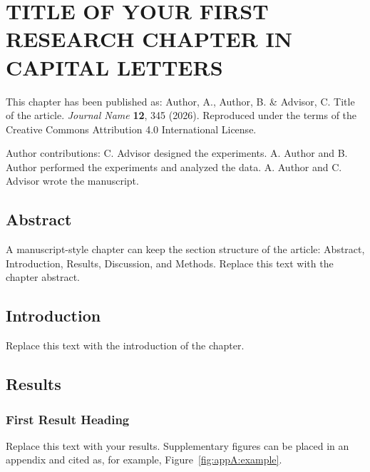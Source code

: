 \chapter{TITLE OF YOUR FIRST RESEARCH CHAPTER IN CAPITAL LETTERS}
\label{ch:manuscript}

\begin{chapternote}
This chapter has been published as: Author, A., Author, B. \& Advisor, C. Title of the article. \textit{Journal Name} \textbf{12}, 345 (2026). Reproduced under the terms of the Creative Commons Attribution 4.0 International License.

Author contributions: C. Advisor designed the experiments. A. Author and B. Author performed the experiments and analyzed the data. A. Author and C. Advisor wrote the manuscript.
\end{chapternote}

\section{Abstract}

A manuscript-style chapter can keep the section structure of the article: Abstract, Introduction, Results, Discussion, and Methods. Replace this text with the chapter abstract.

\section{Introduction}

Replace this text with the introduction of the chapter\cite{Ma2010three}.

\section{Results}

\subsection{First Result Heading}

Replace this text with your results. Supplementary figures can be placed in an appendix and cited as, for example, Figure~\ref{fig:appA:example}.

